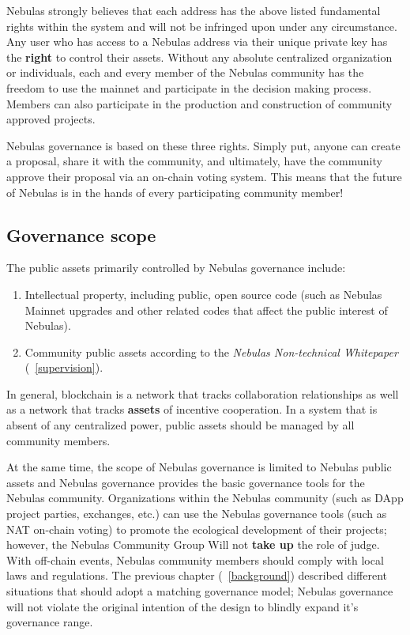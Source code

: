 Nebulas strongly believes that each address has the above listed fundamental rights within the system and will not be infringed upon under any circumstance. Any user who has access to a Nebulas address via their unique private key has the \textbf{right} to control their assets. Without any absolute centralized organization or individuals, each and every member of the Nebulas community has the freedom to use the mainnet and participate in the decision making process. Members can also participate in the production and construction of community approved projects.

Nebulas governance is based on these three rights. Simply put, anyone can create a proposal, share it with the community, and ultimately, have the community approve their proposal via an on-chain voting system. This means that the future of Nebulas is in the hands of every participating community member!

\subsection{Governance scope}


The public assets primarily controlled by Nebulas governance include:

\begin{enumerate}
	\item Intellectual property, including public, open source code (such as Nebulas Mainnet upgrades and other related codes that affect the public interest of Nebulas).
	\item Community public assets according to the \textit{Nebulas Non-technical Whitepaper} (~\ref{supervision}).
\end{enumerate}

In general, blockchain is a network that tracks collaboration relationships as well as a network that tracks \textbf{assets} of incentive cooperation. In a system that is absent of any centralized power, public assets should be managed by all community members.

At the same time, the scope of Nebulas governance is limited to Nebulas public assets and Nebulas governance provides the basic governance tools for the Nebulas community. Organizations within the Nebulas community (such as DApp project parties, exchanges, etc.) can use the Nebulas governance tools (such as NAT on-chain voting) to promote the ecological development of their projects; however, the Nebulas Community Group Will not \textbf{take up} the role of judge. With off-chain events, Nebulas community members should comply with local laws and regulations. The previous chapter (~\ref{background}) described different situations that should adopt a matching governance model; Nebulas governance will not violate the original intention of the design to blindly expand it's governance range.

